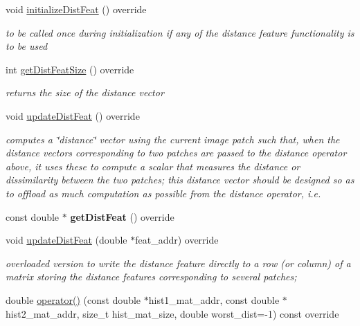\begin{DoxyCompactItemize}
\item 
\hypertarget{classLKLD_ab7b31885fe204266391fcfb627d34aea}{void \hyperlink{classLKLD_ab7b31885fe204266391fcfb627d34aea}{initialize\-Dist\-Feat} () override}\label{classLKLD_ab7b31885fe204266391fcfb627d34aea}

\begin{DoxyCompactList}\small\item\em to be called once during initialization if any of the distance feature functionality is to be used \end{DoxyCompactList}\item 
\hypertarget{classLKLD_a8642de2787175f2c2c31e57aaf4e5c39}{int \hyperlink{classLKLD_a8642de2787175f2c2c31e57aaf4e5c39}{get\-Dist\-Feat\-Size} () override}\label{classLKLD_a8642de2787175f2c2c31e57aaf4e5c39}

\begin{DoxyCompactList}\small\item\em returns the size of the distance vector \end{DoxyCompactList}\item 
void \hyperlink{classLKLD_a856a17227d4c26af42fed9e6dfac5233}{update\-Dist\-Feat} () override
\begin{DoxyCompactList}\small\item\em computes a \char`\"{}distance\char`\"{} vector using the current image patch such that, when the distance vectors corresponding to two patches are passed to the distance operator above, it uses these to compute a scalar that measures the distance or dissimilarity between the two patches; this distance vector should be designed so as to offload as much computation as possible from the distance operator, i.\-e. \end{DoxyCompactList}\item 
\hypertarget{classLKLD_ad16c68e1d9e81b9609b6d93c80bcf88d}{const double $\ast$ {\bfseries get\-Dist\-Feat} () override}\label{classLKLD_ad16c68e1d9e81b9609b6d93c80bcf88d}

\item 
\hypertarget{classLKLD_a157c13f2ea0e02652af73fe35c9daa8c}{void \hyperlink{classLKLD_a157c13f2ea0e02652af73fe35c9daa8c}{update\-Dist\-Feat} (double $\ast$feat\-\_\-addr) override}\label{classLKLD_a157c13f2ea0e02652af73fe35c9daa8c}

\begin{DoxyCompactList}\small\item\em overloaded version to write the distance feature directly to a row (or column) of a matrix storing the distance features corresponding to several patches; \end{DoxyCompactList}\item 
\hypertarget{classLKLD_ab6137015beceaaeccd4aed41a09b37fa}{double \hyperlink{classLKLD_ab6137015beceaaeccd4aed41a09b37fa}{operator()} (const double $\ast$hist1\-\_\-mat\-\_\-addr, const double $\ast$hist2\-\_\-mat\-\_\-addr, size\-\_\-t hist\-\_\-mat\-\_\-size, double worst\-\_\-dist=-\/1) const override}\label{classLKLD_ab6137015beceaaeccd4aed41a09b37fa}


\end{DoxyCompactItemize}
